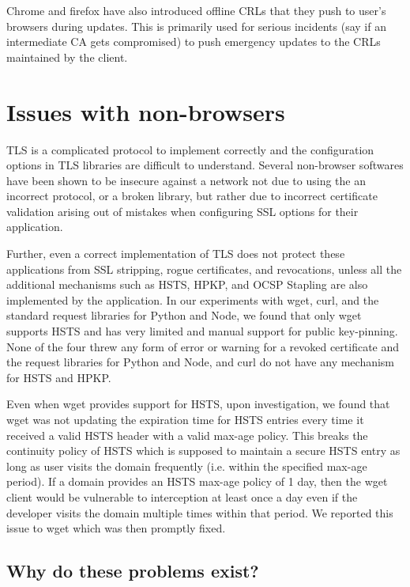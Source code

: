 Chrome and firefox have also introduced offline CRLs that they push to user's
browsers during updates\cite{onecrl}\cite{crlsets}. This is primarily used for
serious incidents (say if an intermediate CA gets compromised) to push
emergency updates to the CRLs maintained by the client.


\section{Issues with non-browsers}
\label{sec:problems-saber}

TLS is a complicated protocol to implement correctly and the configuration
options in TLS libraries are difficult to understand. Several non-browser
softwares have been shown to be insecure against a network not due to using the
an incorrect protocol, or a broken library, but rather due to incorrect
certificate validation arising out of mistakes when configuring SSL options for
their application\cite{dangerous}.

Further, even a correct implementation of TLS does not protect these
applications from SSL stripping, rogue certificates, and revocations, unless
all the additional mechanisms such as HSTS, HPKP, and OCSP Stapling are also
implemented by the application. In our experiments with wget, curl, and the
standard request libraries for Python and Node, we found that only wget
supports HSTS and has very limited and manual support for public key-pinning.
None of the four threw any form of error or warning for a revoked certificate
and the request libraries for Python and Node, and curl do not have any
mechanism for HSTS and HPKP.

Even when wget provides support for HSTS, upon investigation, we found that
wget was not updating the expiration time for HSTS entries every time it
received a valid HSTS header with a valid max-age policy. This breaks the
continuity policy of HSTS which is supposed to maintain a secure HSTS entry as
long as user visits the domain frequently (i.e. within the specified max-age
period). If a domain provides an HSTS max-age policy of 1 day, then the wget
client would be vulnerable to interception at least once a day even if the
developer visits the domain multiple times within that period. We reported this
issue to wget which was then promptly fixed\cite{wget-bug}.

\subsection{Why do these problems exist?}

